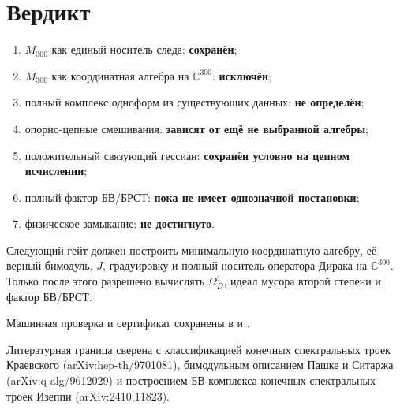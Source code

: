 \section{Вердикт}

\begin{protocol}
\begin{enumerate}
 \item $M_{300}$ как единый носитель следа:
 \textbf{сохранён};
 \item $M_{300}$ как координатная алгебра на $\mathbb C^{300}$:
 \textbf{исключён};
 \item полный комплекс одноформ из существующих данных:
 \textbf{не определён};
 \item опорно-цепные смешивания:
 \textbf{зависят от ещё не выбранной алгебры};
 \item положительный связующий гессиан:
 \textbf{сохранён условно на цепном исчислении};
 \item полный фактор БВ/БРСТ:
 \textbf{пока не имеет однозначной постановки};
 \item физическое замыкание:
 \textbf{не достигнуто}.
\end{enumerate}
\end{protocol}

Следующий гейт должен построить минимальную координатную алгебру, её
верный бимодуль, $J$, градуировку и полный носитель оператора Дирака на
$\mathbb C^{300}$. Только после этого разрешено вычислять
$\Omega_D^1$, идеал мусора второй степени и фактор БВ/БРСТ.

Машинная проверка и сертификат сохранены в
 и
.

Литературная граница сверена с классификацией конечных спектральных троек
Краевского (arXiv:hep-th/9701081), бимодульным описанием Пашке и Ситаржа
(arXiv:q-alg/9612029) и построением БВ-комплекса конечных спектральных
троек Изеппи (arXiv:2410.11823).